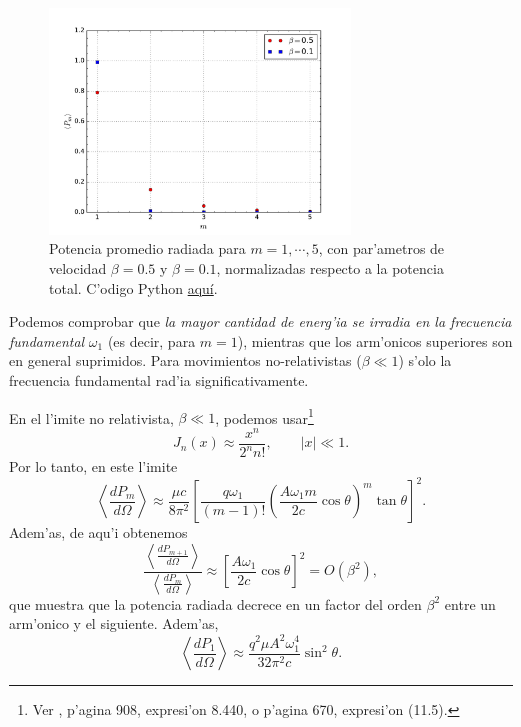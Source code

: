 \begin{figure}[ht]
\centerline{\includegraphics[height=6cm]{fig/fig-mas-potencia-total-comparacion.pdf}}
 \caption{Potencia promedio radiada para $m=1,\cdots,5$, con par'ametros de velocidad $\beta=0.5$ y  $\beta=0.1$, normalizadas respecto a la potencia total.  C'odigo Python \href{https://github.com/gfrubi/electrodinamica/blob/master/figuras-editables/fig-mas-potencia-total-comparacion.py}{aqu\'i}.}
\label{TER3}
\end{figure}
Podemos comprobar que \textit{la mayor cantidad de energ'ia se irradia en la
frecuencia fundamental} $\omega_1$ (es decir, para $m=1$), mientras que los
arm'onicos superiores son en general suprimidos. Para movimientos
no-relativistas ($\beta\ll 1$) s'olo la frecuencia fundamental rad'ia
significativamente.

 En el l'imite no relativista, $\beta\ll 1$, podemos usar\footnote{Ver \cite{GR00}, p'agina 908, expresi'on 8.440, o \cite{AW01} p'agina 670, expresi'on (11.5).}
\begin{equation*}
J_{n}(x)\approx \frac{x^n}{2^nn!}, \qquad |x|\ll 1.
\end{equation*}
Por lo tanto, en este l'imite
\begin{equation}
\left\langle \frac{dP_{m}}{d\Omega}\right\rangle
\approx  \frac{\mu c}{8\pi^2}\left[\frac{q\omega_1}{(m-1)!}\left(\frac{A\omega_1m}{2c}\cos\theta\right)^{m}\tan\theta\right]^2.
\end{equation}
Adem'as, de aqu'i obtenemos
\begin{equation}
\frac{\left\langle \frac{dP_{m+1}}{d\Omega}\right\rangle}{\left\langle \frac{dP_{m}}{d\Omega}\right\rangle}\approx \left[\frac{A\omega_1}{2c}\cos\theta\right]^2=O(\beta^2),
\end{equation}
que muestra que la potencia radiada decrece en un factor del orden $\beta^2$ entre un arm'onico y el siguiente. Adem'as,
\begin{equation}
\left\langle \frac{dP_{1}}{d\Omega}\right\rangle
\approx  \frac{q^2\mu A^2\omega_1^4}{32\pi^2 c}\sin^2\theta.
\end{equation}

